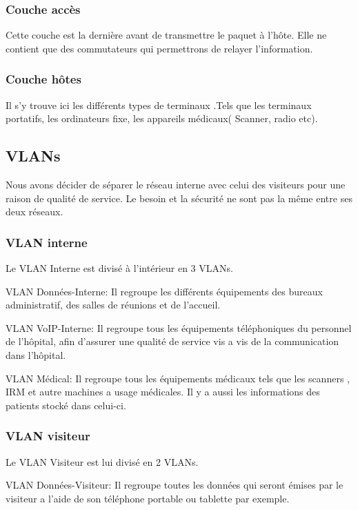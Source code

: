 \subsubsection{Couche accès}
Cette couche est la dernière avant de transmettre le paquet à l'hôte.
Elle ne contient que des commutateurs qui permettrons de relayer l'information.

\subsubsection{Couche hôtes}
Il s'y trouve ici les différents types de terminaux .Tels que les terminaux portatifs, les ordinateurs fixe, les appareils médicaux( Scanner, radio etc).

%
    \cleardoublepage
%
%
\subsection{VLANs}

Nous avons décider de séparer le réseau interne avec celui des visiteurs pour une raison de qualité de service.
Le besoin et la sécurité ne sont pas la même entre ses deux réseaux.

%
%
\subsubsection{VLAN interne}

Le VLAN Interne est divisé à l'intérieur en 3 VLANs.

VLAN Données-Interne:
Il regroupe les différents équipements des bureaux administratif, des salles de réunions et de l'accueil.

VLAN VoIP-Interne:
Il regroupe tous les équipements téléphoniques du personnel de l'hôpital, afin d'assurer une qualité de service vis a vis de la communication dans l'hôpital.

VLAN Médical:
Il regroupe tous les équipements médicaux tels que les scanners , IRM et autre machines a usage médicales.
Il y a aussi les informations des patients stocké dans celui-ci.

%
%
\subsubsection{VLAN visiteur}

Le VLAN Visiteur est lui divisé en 2 VLANs.

VLAN Données-Visiteur:
Il regroupe toutes les données qui seront émises par le visiteur a l'aide de son téléphone portable ou tablette par exemple.

